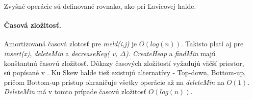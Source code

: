 Zvyšné operácie sú definované rovnako, ako pri Ľavicovej halde.

\paragraph{Časová zložitosť.}
Amortizovaná časová zlotosť pre \emph{meld(i,j)} je $O(log(n))$. Takisto platí aj pre \emph{insert(x)}, \emph{deleteMin} a \emph{decreaseKey( v, $\Delta$)}. \emph{CreateHeap} a \emph{findMin} majú konštantnú časovú zložitosť. Dôkazy časových zložitostí vyžadujú väčší priestor, sú popísané v \cite{skew}.
Ku Skew halde tiež existujú alternatívy - Top-down, Bottom-up, pričom Bottom-up prístup ohraničuje všetky operácie až na 
\emph{deleteMin} na $O(1)$. \emph{DeleteMin} má v tomto prípade časovú zložitosť $O(log(n))$.